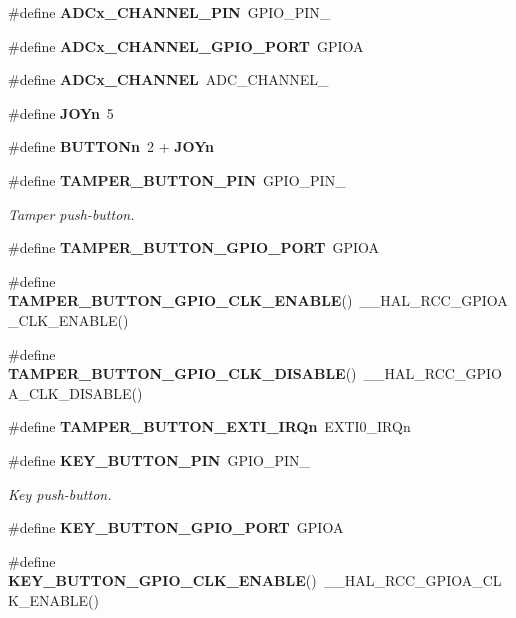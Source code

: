 \begin{DoxyCompactItemize}
\item 
\#define \textbf{ A\+D\+Cx\+\_\+\+C\+H\+A\+N\+N\+E\+L\+\_\+\+P\+IN}~G\+P\+I\+O\+\_\+\+P\+I\+N\+\_
\item 
\#define \textbf{ A\+D\+Cx\+\_\+\+C\+H\+A\+N\+N\+E\+L\+\_\+\+G\+P\+I\+O\+\_\+\+P\+O\+RT}~G\+P\+I\+OA
\item 
\#define \textbf{ A\+D\+Cx\+\_\+\+C\+H\+A\+N\+N\+EL}~A\+D\+C\+\_\+\+C\+H\+A\+N\+N\+E\+L\+\_
\item 
\#define \textbf{ J\+O\+Yn}~5
\item 
\#define \textbf{ B\+U\+T\+T\+O\+Nn}~2 + \textbf{ J\+O\+Yn}
\item 
\#define \textbf{ T\+A\+M\+P\+E\+R\+\_\+\+B\+U\+T\+T\+O\+N\+\_\+\+P\+IN}~G\+P\+I\+O\+\_\+\+P\+I\+N\+\_
\begin{DoxyCompactList}\small\item\em Tamper push-\/button. \end{DoxyCompactList}\item 
\#define \textbf{ T\+A\+M\+P\+E\+R\+\_\+\+B\+U\+T\+T\+O\+N\+\_\+\+G\+P\+I\+O\+\_\+\+P\+O\+RT}~G\+P\+I\+OA
\item 
\#define \textbf{ T\+A\+M\+P\+E\+R\+\_\+\+B\+U\+T\+T\+O\+N\+\_\+\+G\+P\+I\+O\+\_\+\+C\+L\+K\+\_\+\+E\+N\+A\+B\+LE}()~\+\_\+\+\_\+\+H\+A\+L\+\_\+\+R\+C\+C\+\_\+\+G\+P\+I\+O\+A\+\_\+\+C\+L\+K\+\_\+\+E\+N\+A\+B\+LE()
\item 
\#define \textbf{ T\+A\+M\+P\+E\+R\+\_\+\+B\+U\+T\+T\+O\+N\+\_\+\+G\+P\+I\+O\+\_\+\+C\+L\+K\+\_\+\+D\+I\+S\+A\+B\+LE}()~\+\_\+\+\_\+\+H\+A\+L\+\_\+\+R\+C\+C\+\_\+\+G\+P\+I\+O\+A\+\_\+\+C\+L\+K\+\_\+\+D\+I\+S\+A\+B\+LE()
\item 
\#define \textbf{ T\+A\+M\+P\+E\+R\+\_\+\+B\+U\+T\+T\+O\+N\+\_\+\+E\+X\+T\+I\+\_\+\+I\+R\+Qn}~E\+X\+T\+I0\+\_\+\+I\+R\+Qn
\item 
\#define \textbf{ K\+E\+Y\+\_\+\+B\+U\+T\+T\+O\+N\+\_\+\+P\+IN}~G\+P\+I\+O\+\_\+\+P\+I\+N\+\_
\begin{DoxyCompactList}\small\item\em Key push-\/button. \end{DoxyCompactList}\item 
\#define \textbf{ K\+E\+Y\+\_\+\+B\+U\+T\+T\+O\+N\+\_\+\+G\+P\+I\+O\+\_\+\+P\+O\+RT}~G\+P\+I\+OA
\item 
\#define \textbf{ K\+E\+Y\+\_\+\+B\+U\+T\+T\+O\+N\+\_\+\+G\+P\+I\+O\+\_\+\+C\+L\+K\+\_\+\+E\+N\+A\+B\+LE}()~\+\_\+\+\_\+\+H\+A\+L\+\_\+\+R\+C\+C\+\_\+\+G\+P\+I\+O\+A\+\_\+\+C\+L\+K\+\_\+\+E\+N\+A\+B\+LE()
\item 

\end{DoxyCompactItemize}
